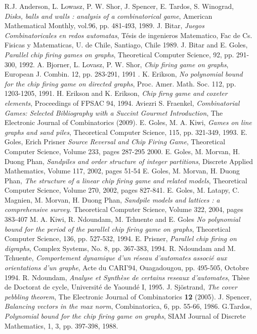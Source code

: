 \documentclass{article}
\begin{document}
\begin{thebibliography}{AND 89}
 R.J. Anderson, L. Lowasz, P. W. Shor, J. Spencer, E. Tardos,
 S. Winograd,
 {\it Disks, balls and walls : analysis of a combinatorical game},
 American Mathematical Monthly, vol.96, pp. 481-493,
 1989.
 J. Bitar,
 {\it Juegos Combinatoricales en redos automatas},
 T\'esis de ingenieros Matematico, Fac de Cs. Fisicas y Matematicas, U. de
 Chile, Santiago, Chile
 1989.
 J. Bitar and E. Goles,
 {\it Parallel chip firing games on graphs},
 Theoretical Computer Science, 92, pp. 291-300,
 1992.
 A. Bjorner, L. Lovasz, P. W. Shor,
 {\it Chip firing game on graphs},
 European J. Combin. 12, pp. 283-291,
 1991 .
 K. Erikson,
 {\it No polynomial bound for the chip firing game on directed graphs},
Proc. Amer. Math. Soc. 112, pp. 1203-1205,
 1991.
 H. Erikson and K. Erikson,
 {\it Chip firng game and coxeter elements},
 Proceedings of FPSAC 94,
 1994.
 Aviezri S. Fraenkel,
 {\it Combinatorial Games: Selected Bibliography with a Succint Gourmet Introduction},
 The Electronic Journal of Combinatorics (2009).
 E. Goles, M. A. Kiwi,
 {\it Games on line graphs and sand piles},
 Theoretical Computer Science, 115, pp. 321-349,
 1993.
 E. Goles, Erich Prisner
 {\it Source Reversal and Chip Firing Game},
 Theoretical Computer Science, Volume 233, pages 287-295
 2000.
 E. Goles, M. Morvan, H. Duong Phan, {\it Sandpiles and order structure of integer partitions},
 Discrete Applied Mathematics, Volume 117, 2002, pages 51-54
 E. Goles, M. Morvan, H. Duong Phan, {\it The structure of a linear chip firing game and related models},
 Theoretical Computer Science, Volume 270, 2002, pages 827-841.
 E. Goles, M. Latapy, C. Magnien, M. Morvan, H. Duong Phan, {\it Sandpile models and lattices : a
 comprehensive survey}. Theoretical Computer Science, Volume 322, 2004, pages 383-407
 M. A. Kiwi, R. Ndoundam, M. Tchuente and E. Goles
 {\it No polynomial bound for the period of the parallel chip firing game on graphs},
 Theoretical Computer Science, 136, pp. 527-532,
 1994.
 E. Prisner,
 {\it Parallel chip firing on digraphs},
Complex Systems, No. 8, pp. 367-383,
 1994.
 R. Ndoundam and M. Tchuente,
 {\it Comportement dynamique d'un r\'eseau d'automates associ\'e aux
 orientations d'un graphe},
Acte du CARI'94, Ouagadougou, pp. 495-505,
 Octobre 1994.
 R. Ndoundam,
 {\it Analyse et Synth\`ese de certains reseaux d'automates},
Th\`ese de Doctorat de  cycle, Universit\'e de Yaound\'e I,
 1995.
 J. Sj\"{o}strand, {\it The cover pebbling theorem},
 The Electronic Journal of Combinatorics {\bf 12} (2005). 
 J. Spencer,
 {\it Balancing vectors in the max norm},
Combinatorica, 6, pp. 55-66,
 1986.
 G.Tardos,
 {\it Polynomial bound for the chip firing game on graphs},
SIAM Journal of Discrete Mathematics, 1, 3, pp. 397-398,
 1988.
\end{thebibliography}
\end{document}
